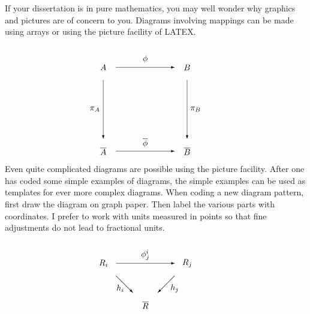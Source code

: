 %




   If your dissertation is in pure mathematics, you may
well wonder why graphics and pictures are of concern to you.
Diagrams involving mappings can be made using 
arrays or using the picture facility of LATEX.  

\newcommand{\EEV}{\vector( 1, 0)}
\newcommand{\SSV}{\vector( 0,-1)}
\newcommand{\MB}{\makebox( 0, 0)} 
\newcommand{\SEV}{\vector( 1,-1)}
\newcommand{\SWV}{\vector(-1,-1)}


\begin{equation}
 \begin{array}{c}    %
 \setlength{\unitlength}{1pt}
 \begin{picture}(125,125)
%
  \put(  0,100){\MB{$A$}}
  \put(100,100){\MB{$B$}}
  \put( 15,100){\EEV{70}}
  \put( 50,110){\MB{$\phi$}} 
% 
  \put(  0, 0){\MB{$\overline{A}$}}
  \put(100, 0){\MB{$\overline{B}$}}
  \put( 15, 0){\EEV{70}}  
  \put( 50,10){\MB{$\overline{\phi}$}} 
% 
  \put(  0, 85){\SSV{70}}
  \put(-10, 50){\MB{$ \pi_A$}} 
%  
  \put(100, 85){\SSV{70}}
  \put(110, 50){\MB{$\pi_B$}} 
%
 \end{picture}
 \end{array}
\end{equation}
\vspace{24pt}


Even quite complicated diagrams are 
possible using the picture facility. 
After one has coded some simple examples of diagrams,
the simple examples can be used as templates for
ever more complex diagrams.  When coding a new diagram pattern,
first draw the diagram on graph paper.   Then
label the various parts with coordinates. I prefer to work 
with units measured in points so that fine adjustments 
do not lead to fractional units.


\begin{equation}
 \begin{array}{c}    %
 \setlength{\unitlength}{1pt}
 \begin{picture}(125,75)
%
  \put( 0,50){\MB{$R_i$}}
  \put(15,50){\EEV{70}}
  \put(50,60){\MB{$\phi_j^i$}} 
  \put(15,35){\SEV{20}}
  \put(20,20){\MB{$h_i$}}
%
  \put(100,50){\MB{$R_j$}}
  \put( 85,35){\SWV{20}}
% 
  \put( 50, 0){\MB{$\overline{R}$}}
  \put( 85,20){\MB{$h_j$}}
%
 \end{picture}
\end{array}
\end{equation}
 
\endinput




 
